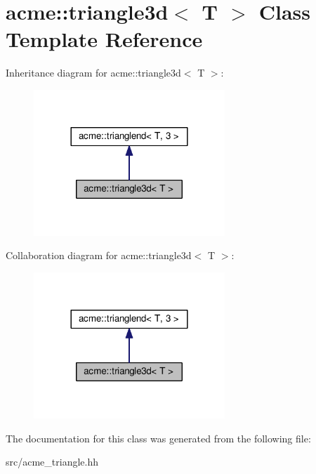 \hypertarget{classacme_1_1triangle3d}{}\section{acme\+:\+:triangle3d$<$ T $>$ Class Template Reference}
\label{classacme_1_1triangle3d}


Inheritance diagram for acme\+:\+:triangle3d$<$ T $>$\+:
\nopagebreak
\begin{figure}[H]
\begin{center}
\leavevmode
\includegraphics[width=204pt]{da/dec/classacme_1_1triangle3d__inherit__graph}
\end{center}
\end{figure}


Collaboration diagram for acme\+:\+:triangle3d$<$ T $>$\+:
\nopagebreak
\begin{figure}[H]
\begin{center}
\leavevmode
\includegraphics[width=204pt]{d7/dab/classacme_1_1triangle3d__coll__graph}
\end{center}
\end{figure}


The documentation for this class was generated from the following file\+:\begin{DoxyCompactItemize}
\item 
src/acme\+\_\+triangle.\+hh\end{DoxyCompactItemize}
